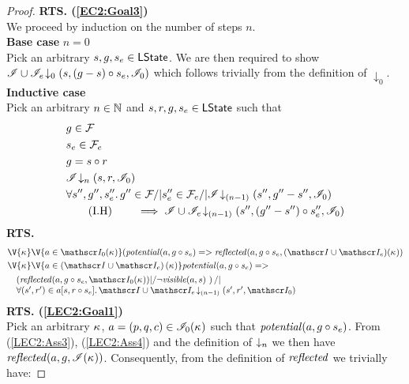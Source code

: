 \begin{lemma}
\begin{proof}
\noindent\textbf{RTS. (\ref{EC2:Goal3})} \\
We proceed by induction on the number of steps $n$.\\

\noindent\textbf{Base case }$n=0$\\
Pick an arbitrary $s, g, s_e \in \textsf{LState}$. We are then required to show	$\mathscr{I} \cup \mathscr{I}_e \!\downarrow_{0} \left(s, (g-s) \circ s_e, \mathscr{I}_0\right)$ which follows trivially from the definition of $\downarrow_0$.\\


\noindent\textbf{Inductive case }\\
Pick an arbitrary $n \in \mathbb{N}$ and $s, r, g, s_e \in \textsf{LState}$ such that
%
\begin{align}
	& g \in \mathcal{F}_{} \label{LEC2:Ass1}\\
	& s_e \in \mathcal{F}_{e} \label{LEC2:Ass2}\\
	& g = s \circ r \label{LEC2:Ass3} \\
	& \mathscr{I} \!\downarrow_{n} \left(s, r, \mathscr{I}_0\right) \label{LEC2:Ass4}\\
	& \forall s'', g'', s_e''.\,  g'' \in \mathcal{F}_{} /| s''_e \in \mathcal{F}_{e} /| \mathscr{I} \!\downarrow_{(n-1)} \left(s'', g''-s'', \mathscr{I}_0\right) \nonumber \\
	& \tag{I.H} \qquad \implies \mathscr{I} \cup \mathscr{I}_{e} \!\downarrow_{(n-1)} \left(s'', (g''-s'') \circ s_e'', \mathscr{I}_{0}\right) \label{LEC2:IH}
\end{align}
%
\textbf{RTS.}
%
\begin{align}
	& 
	\V{\ca{}}\V{a\in \lmod_0(\ca{})} 
  (\m{potential}(a, g \composeL s_e) => \m{reflected}(a, g \composeL s_e, (\lmod \cup \lmod_e)(\ca{})) \label{LEC2:Goal1}\\
  &\V{\ca{}}\V{a\in \left(\lmod \cup \lmod_e \right) (\ca{})}
  \m{potential}(a,g \composeL s_e) =>\null \nonumber \\
	& \quad
  \begin{array}{@{} l @{}}
		\left(\m{reflected}(a,g \composeL s_e, \lmod_0(\ca{})) |/ \neg\m{visible}(a, s) \ \right) /| \\
		\for{(s', r') \in a[s, r \composeL s_e]} \extendsAMUpto{\lmod \cup \lmod_e}{(n-1)}{s'}{r'}{\lmod_0}
 	\end{array} \label{LEC2:Goal2}
\end{align}
%
%
\noindent\textbf{RTS. (\ref{LEC2:Goal1})}\\
Pick an arbitrary $\kappa_{}$, $a = (p, q, c) \in \mathscr{I}_0(\kappa_{})$ such that $\mathit{potential}(a, g \circ s_e)$. From (\ref{LEC2:Ass3}), (\ref{LEC2:Ass4}) and the definition of $\downarrow_n$ we then have $\mathit{reflected}(a, g, \mathscr{I}(\kappa_{}))$. Consequently, from the definition of $\mathit{reflected}$ we trivially have:

\end{proof}
\end{lemma}
